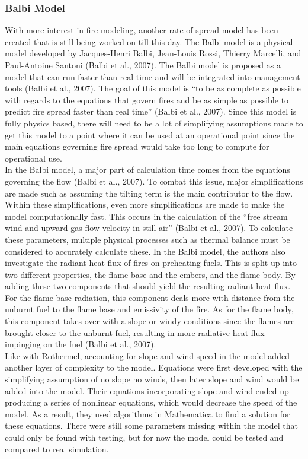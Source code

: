 \documentclass{article}
\begin{document}
\subsubsection{Balbi Model}
\indent With more interest in fire modeling, another rate of spread model has been created that is still being worked on till this day. The Balbi model is a physical model developed by Jacques-Henri Balbi, Jean-Louis Rossi, Thierry Marcelli, and Paul-Antoine Santoni (Balbi et al., 2007). The Balbi model is proposed as a model that can run faster than real time and will be integrated into management tools (Balbi et al., 2007). The goal of this model is “to be as complete as possible with regards to the equations that govern fires and be as simple as possible to predict fire spread faster than real time” (Balbi et al., 2007). Since this model is fully physics based, there will need to be a lot of simplifying assumptions made to get this model to a point where it can be used at an operational point since the main equations governing fire spread would take too long to compute for operational use.  \\
\indent In the Balbi model, a major part of calculation time comes from the equations governing the flow (Balbi et al., 2007). To combat this issue, major simplifications are made such as assuming the tilting term is the main contributor to the flow. Within these simplifications, even more simplifications are made to make the model computationally fast. This occurs in the calculation of the “free stream wind and upward gas flow velocity in still air” (Balbi et al., 2007). To calculate these parameters, multiple physical processes such as thermal balance must be considered to accurately calculate these. In the Balbi model, the authors also investigate the radiant heat flux of fires on preheating fuels. This is split up into two different properties, the flame base and the embers, and the flame body. By adding these two components that should yield the resulting radiant heat flux. For the flame base radiation, this component deals more with distance from the unburnt fuel to the flame base and emissivity of the fire. As for the flame body, this component takes over with a slope or windy conditions since the flames are brought closer to the unburnt fuel, resulting in more radiative heat flux impinging on the fuel (Balbi et al., 2007). \\
\indent Like with Rothermel, accounting for slope and wind speed in the model added another layer of complexity to the model. Equations were first developed with the simplifying assumption of no slope no winds, then later slope and wind would be added into the model. Their equations incorporating slope and wind ended up producing a series of nonlinear equations, which would decrease the speed of the model. As a result, they used algorithms in Mathematica to find a solution for these equations. There were still some parameters missing within the model that could only be found with testing, but for now the model could be tested and compared to real simulation. \\
\end{document}
